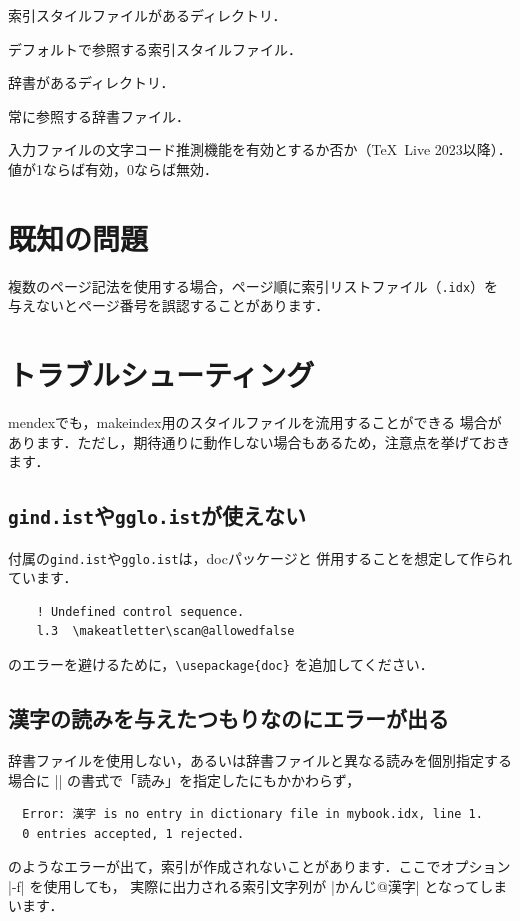 \documentclass[a4paper,dvipdfmx]{jsarticle}
\newcommand{\SoftName}[1]{\textsf{#1}}
\newcommand{\FileName}[1]{\texttt{#1}}
\newcommand{\FileExtension}[1]{\texttt{.#1}}
\begin{document}
\begin{description}[leftmargin=5cm]
\item[|INDEXSTYLE|]
索引スタイルファイルがあるディレクトリ．

\item[|INDEXDEFAULTSTYLE|]
デフォルトで参照する索引スタイルファイル．

\item[|INDEXDICTIONARY|]
辞書があるディレクトリ．

\item[|INDEXDEFAULTDICTIONARY|]
常に参照する辞書ファイル．

\item[|guess\string_input\string_kanji\string_encoding|]
入力ファイルの文字コード推測機能を有効とするか否か（\TeX~Live 2023以降）．
値が1ならば有効，0ならば無効．
\end{description}

\section{既知の問題}
複数のページ記法を使用する場合，ページ順に索引リストファイル（\FileExtension{idx}）を
与えないとページ番号を誤認することがあります．


\section{トラブルシューティング}
\SoftName{mendex}でも，\SoftName{makeindex}用のスタイルファイルを流用することができる
場合があります．ただし，期待通りに動作しない場合もあるため，注意点を挙げておきます．

\subsection{\FileName{gind.ist}や\FileName{gglo.ist}が使えない}
\LaTeXe 付属の\FileName{gind.ist}や\FileName{gglo.ist}は，\SoftName{doc}パッケージと
併用することを想定して作られています．
\begin{verbatim}
    ! Undefined control sequence.
    l.3  \makeatletter\scan@allowedfalse
\end{verbatim}
のエラーを避けるために，\verb+\usepackage{doc}+ を追加してください．

\subsection{漢字の読みを与えたつもりなのにエラーが出る}
辞書ファイルを使用しない，あるいは辞書ファイルと異なる読みを個別指定する場合に
|| の書式で「読み」を指定したにもかかわらず，
\begin{verbatim}
  Error: 漢字 is no entry in dictionary file in mybook.idx, line 1.
  0 entries accepted, 1 rejected.
\end{verbatim}
のようなエラーが出て，索引が作成されないことがあります．ここでオプション |-f| を使用しても，
実際に出力される索引文字列が |かんじ@漢字| となってしまいます．
\end{document}
